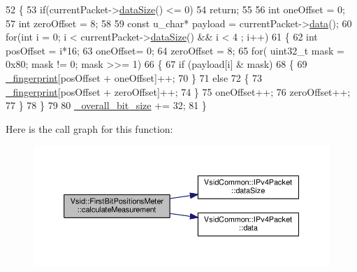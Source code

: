 \begin{DoxyCode}
52 \{   
53     \textcolor{keywordflow}{if}(currentPacket->\hyperlink{class_vsid_common_1_1_i_pv4_packet_a39fe36210895625ee87320f5c0c7f52e}{dataSize}() <= 0)
54         \textcolor{keywordflow}{return};
55 
56     \textcolor{keywordtype}{int} oneOffset = 0;
57     \textcolor{keywordtype}{int} zeroOffset = 8;
58 
59     \textcolor{keyword}{const} u\_char* payload = currentPacket->\hyperlink{class_vsid_common_1_1_i_pv4_packet_a9fb8c763d740e193a68c55604a8a7bd6}{data}();
60     \textcolor{keywordflow}{for}(\textcolor{keywordtype}{int} i = 0; i < currentPacket->\hyperlink{class_vsid_common_1_1_i_pv4_packet_a39fe36210895625ee87320f5c0c7f52e}{dataSize}() && i < 4 ; i++)
61     \{
62         \textcolor{keywordtype}{int} posOffset = i*16;
63         oneOffset= 0;
64         zeroOffset = 8;
65         \textcolor{keywordflow}{for}( uint32\_t mask = 0x80; mask != 0; mask >>= 1)
66         \{
67             \textcolor{keywordflow}{if} (payload[i] & mask)
68             \{
69                 \hyperlink{class_vsid_1_1_attribute_meter_a0386b2fe9c5d6ab6fba16029d8da4efe}{\_fingerprint}[posOffset + oneOffset]++;
70             \}
71             \textcolor{keywordflow}{else}
72             \{
73                 \hyperlink{class_vsid_1_1_attribute_meter_a0386b2fe9c5d6ab6fba16029d8da4efe}{\_fingerprint}[posOffset + zeroOffset]++;
74             \}
75             oneOffset++;
76             zeroOffset++;
77         \}
78     \}
79 
80     \hyperlink{class_vsid_1_1_first_bit_positions_meter_a2557a44d6bf953c4f352f1e465fb1f43}{\_overall\_bit\_size} += 32;
81 \}\end{DoxyCode}


Here is the call graph for this function\-:
\nopagebreak
\begin{figure}[H]
\begin{center}
\leavevmode
\includegraphics[width=350pt]{class_vsid_1_1_first_bit_positions_meter_a516fe18ee500c57c6c5fa2f51091b88a_cgraph}
\end{center}
\end{figure}


